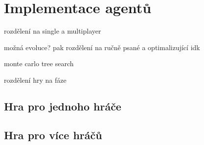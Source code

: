 \chapter{Implementace agentů}

rozdělení na single a multiplayer

možná evoluce? pak rozdělení na ručně psané a optimalizující idk

monte carlo tree search

rozdělení hry na fáze

\section{Hra pro jednoho hráče}
\section{Hra pro více hráčů}
